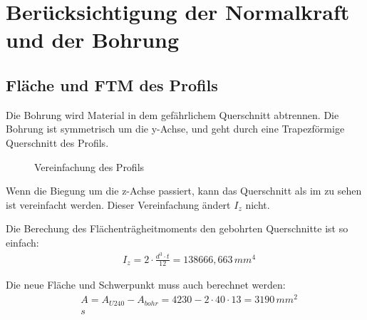 \section{Berücksichtigung der Normalkraft und der Bohrung}
\subsection{Fläche und FTM des Profils}
Die Bohrung wird Material in dem gefährlichem Querschnitt abtrennen. Die Bohrung ist symmetrisch um die y-Achse, und geht durch eine Trapezförmige Querschnitt des Profils.

\begin{figure}[H]
  \centering
  \caption{Vereinfachung des Profils}
  \label{fig:trapezinrechteck}
\end{figure}
Wenn die Biegung um die z-Achse passiert, kann das Querschnitt als im  zu sehen ist vereinfacht werden. Dieser Vereinfachung ändert $I_z$ nicht.

Die Berechung des Flächenträgheitmoments den gebohrten Querschnitte ist so einfach:
\begin{align*}
  &I_z = 2 \cdot \frac{d^3 \cdot t}{12} = 138666,663 \, mm^4
\end{align*}

Die neue Fläche und Schwerpunkt muss auch berechnet werden:
\begin{align*}
  &A = A_{U240} - A_{bohr} = 4230 - 2 \cdot 40 \cdot 13 = 3190 \, mm^2 \\
  &s
\end{align*}
